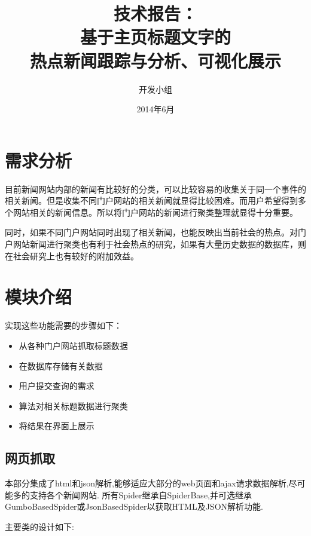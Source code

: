 \documentclass[12pt]{article}
\begin{document}
\title{技术报告：\\[3ex] 基于主页标题文字的\\热点新闻跟踪与分析、可视化展示\\[3ex]}

\author{开发小组}

\date{2014年6月}
\maketitle
\newpage
\renewcommand{\contentsname}{技术报告}
\tableofcontents
\newpage
\section{需求分析}
目前新闻网站内部的新闻有比较好的分类，可以比较容易的收集关于同一个事件的相关新闻。但是收集不同门户网站的相关新闻就显得比较困难。而用户希望得到多个网站相关的新闻信息。所以将门户网站的新闻进行聚类整理就显得十分重要。

同时，如果不同门户网站同时出现了相关新闻，也能反映出当前社会的热点。对门户网站新闻进行聚类也有利于社会热点的研究，如果有大量历史数据的数据库，则在社会研究上也有较好的附加效益。

\section{模块介绍}
实现这些功能需要的步骤如下：
\begin{itemize}
\item 从各种门户网站抓取标题数据
\item 在数据库存储有关数据
\item 用户提交查询的需求
\item 算法对相关标题数据进行聚类
\item 将结果在界面上展示
\end{itemize}

\subsection{网页抓取}
本部分集成了html和json解析,能够适应大部分的web页面和ajax请求数据解析,尽可能多的支持各个新闻网站.
所有Spider继承自SpiderBase,并可选继承GumboBasedSpider或JsonBasedSpider以获取HTML及JSON解析功能.

主要类的设计如下:
\end{document}
